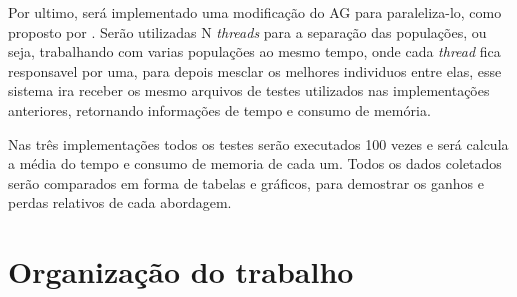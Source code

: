 Por ultimo, será implementado uma modificação do AG para paraleliza-lo, como proposto por \cite{Alaoui}. Serão utilizadas N \textit{threads} para a separação das populações, ou seja, trabalhando com varias populações ao mesmo tempo, onde cada \textit{thread} fica responsavel por uma, para depois mesclar os melhores individuos entre elas, esse sistema ira receber os mesmo arquivos de testes utilizados nas implementações anteriores, retornando informações de tempo e consumo de memória.

Nas três implementações todos os testes serão executados 100 vezes e será calcula a média do tempo e consumo de memoria de cada um. Todos os dados coletados serão comparados em forma de tabelas e gráficos, para demostrar os ganhos e perdas relativos de cada abordagem.




\section{Organização do trabalho}


